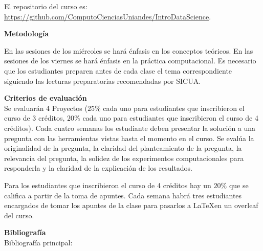 \documentclass[letterpaper,10pt,onecolumn]{article}
\begin{document}
El repositorio del curso es:
\url{https://github.com/ComputoCienciasUniandes/IntroDataScience}.

\vspace*{0.5cm} 
\noindent\textbf{\large {} \quad
  Metodolog\'ia}\\[-0.2cm] 


\noindent\normalsize 

En las sesiones de los miércoles se hará énfasis en los conceptos teóricos.
En las sesiones de los viernes se hará énfasis en la práctica computacional.
Es necesario que los estudiantes preparen antes de cada clase el
tema correspondiente siguiendo las lecturas
preparatorias recomendadas por SICUA.

\vspace*{0.5cm} 
\noindent\textbf{\large {} \quad Criterios de
  evaluaci\'on}\\[-0.2cm] 

Se evaluarán 4 Proyectos ($25\%$ cada uno para estudiantes que inscribieron el curso de 3 créditos, $20$\% cada uno para estudiantes que inscribieron el curso de 4 créditos). Cada cuatro semanas los estudiante deben presentar la solución a una pregunta con las herramientas vistas  hasta el momento en el curso. 
Se evalúa la originalidad de la pregunta, la claridad del planteamiento de la pregunta, la relevancia del pregunta, la solidez de los experimentos computacionales para responderla y la claridad de la explicación de los resultados.

Para los estudiantes que inscribieron el curso de 4 créditos hay un $20\%$ que se califica a partir de la toma de apuntes. Cada semana habrá tres estudiantes encargados de tomar los apuntes de la clase para pasarlos a \LaTeX en un overleaf del curso.

\vspace*{0.5cm} 


\noindent\textbf{\large {} \quad
  Bibliograf\'ia}\\[-0.2cm] 



\noindent\normalsize Bibliograf\'ia principal:
\end{document}
